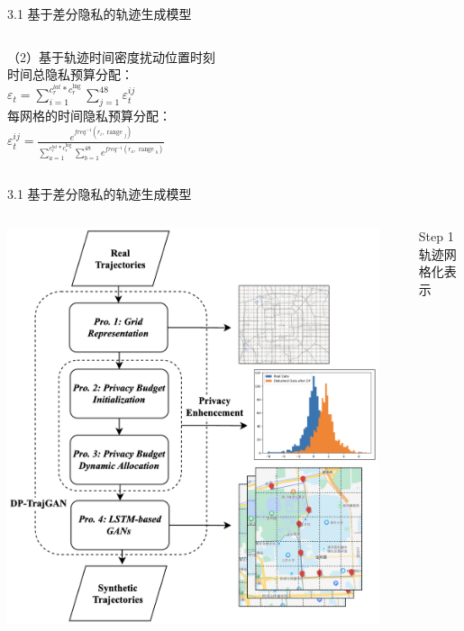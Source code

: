 \documentclass{sintefbeamer}
\begin{document}
\begin{frame}{3.1 基于差分隐私的轨迹生成模型}
\begin{columns}
\begin{column}{0.5\textwidth}
\begin{itemize}
 （2）基于轨迹时间密度扰动位置时刻\\
时间总隐私预算分配：\\$\varepsilon_t=\sum_{i=1}^{c_r^{l a t} * c_r^{\operatorname{lng}}} \sum_{j=1}^{48} \varepsilon_t^{i j}$\\
每网格的时间隐私预算分配：\\
  $\varepsilon_t^{i j}=\frac{e^{f r e q^{-1}\left(r_i, \text { range }_j\right)}}{\sum_{a=1}^{c_r^{l a t} * c_r^{\operatorname{lng}}} \sum_{b=1}^{48} e^{f r e q^{-1}\left(r_a, \text { range }_b\right)}}$

 \end{itemize}
\end{column}
\end{columns}
\end{frame}

\begin{frame}{3.1 基于差分隐私的轨迹生成模型}
\begin{columns}
\begin{column}{0.5\textwidth}
\includegraphics[height=1\textheight]{images/survey1}
\end{column}
\begin{column}{0.5\textwidth}
\begin{itemize}
  \item[Step 1] 轨迹网格化表示

\end{itemize}
\end{column}
\end{columns}
\end{frame}
\end{document}

